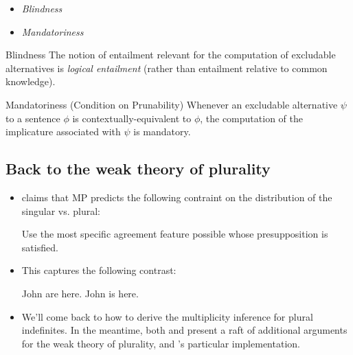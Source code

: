 \documentclass[landscape,twocolumn,cronos,paper=letter]{ling-handout}
\begin{document}
\begin{itemize}
    \begin{itemize}

      \item \textit{Blindness}

      \item \textit{Mandatoriness}

    \end{itemize}

    \begin{tcolorbox}
      Blindness
      \tcblower
      The notion of entailment relevant for the computation of excludable
      alternatives is \textit{logical entailment} (rather than entailment
      relative to common knowledge).
    \end{tcolorbox}

    \begin{tcolorbox}
      Mandatoriness (Condition on Prunability)
      \tcblower
      Whenever an excludable alternative $ψ$ to a sentence $ϕ$ is
      contextually-equivalent to $ϕ$, the computation of the implicature
      associated with $ψ$ is mandatory.
    \end{tcolorbox}

\end{itemize}

    \subsection{Back to the weak theory of plurality}

    \begin{itemize}

        \item \citet{sauerland2003} claims that MP predicts the following
        contraint on the distribution of the singular vs. plural:

        \ex
        Use the most specific agreement feature possible whose presupposition is satisfied.
        \xe

        \item This captures the following contrast:

        \pex
        \a\ljudge{*}John are here.
        \a John is here.
        \xe

        \item We'll come back to how to derive the multiplicity inference for
        plural indefinites. In the meantime, both \citet{sauerland2003} and
        \citet{sauerlandAnderssenYatsushiro2005} present a raft of additional
        arguments for the weak theory of plurality, and
        \citeauthor{sauerland2003l}'s particular implementation.

        \end{itemize}
\end{document}
